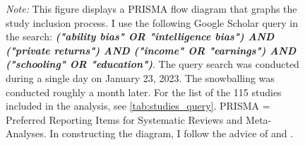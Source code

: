 \begin{figure}[!htbp]
\begin{tikzpicture}[
            node distance=0.9cm,
            start chain=1 going below,
            every join/.style=arrow,
        ]
    \end{tikzpicture}
    \vspace{0.1cm}
    \captionsetup{width=0.9\textwidth, font = scriptsize}
    \caption*{\emph{Note:} This figure displays a PRISMA flow diagram that graphs the study inclusion process. I use the following Google Scholar query in the search: \textit{\textbf{("ability bias" OR "intelligence bias") AND ("private returns") AND ("income" OR "earnings") AND ("schooling" OR "education")}}. The query search was conducted during a single day on January 23, 2023. The snowballing was conducted roughly a month later. For the list of the 115 studies included in the analysis, see \autoref{tab:studies_query}. PRISMA = Preferred Reporting Items for Systematic Reviews and Meta-Analyses. In constructing the diagram, I follow the advice of \cite{moher2009preferred} and \cite{havranek2020guidelines}.}
\end{figure}


